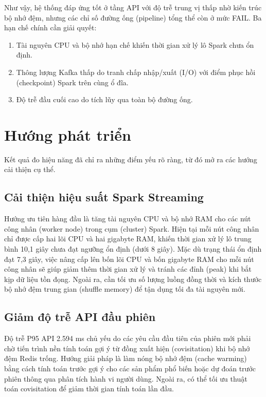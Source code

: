 \documentclass[../BTL.tex]{subfiles}
\begin{document}
Như vậy, hệ thống đáp ứng tốt ở tầng API với độ trễ trung vị thấp nhờ kiến trúc bộ nhớ đệm, nhưng các chỉ số đường ống (pipeline) tổng thể còn ở mức FAIL. Ba hạn chế chính cần giải quyết:
\begin{enumerate}
    \item Tài nguyên CPU và bộ nhớ hạn chế khiến thời gian xử lý lô Spark chưa ổn định.
    \item Thông lượng Kafka thấp do tranh chấp nhập/xuất (I/O) với điểm phục hồi (checkpoint) Spark trên cùng ổ đĩa.
    \item Độ trễ đầu cuối cao do tích lũy qua toàn bộ đường ống.
\end{enumerate}

\section{Hướng phát triển}

Kết quả đo hiệu năng đã chỉ ra những điểm yếu rõ ràng, từ đó mở ra các hướng cải thiện cụ thể.

\subsection{Cải thiện hiệu suất Spark Streaming}
Hướng ưu tiên hàng đầu là tăng tài nguyên CPU và bộ nhớ RAM cho các nút công nhân (worker node) trong cụm (cluster) Spark. Hiện tại mỗi nút công nhân chỉ được cấp hai lõi CPU và hai gigabyte RAM, khiến thời gian xử lý lô trung bình 10,1 giây chưa đạt ngưỡng ổn định (dưới 8 giây). Mặc dù trạng thái ổn định đạt 7,3 giây, việc nâng cấp lên bốn lõi CPU và bốn gigabyte RAM cho mỗi nút công nhân sẽ giúp giảm thêm thời gian xử lý và tránh các đỉnh (peak) khi bắt kịp dữ liệu tồn đọng. Ngoài ra, cần tối ưu số lượng luồng đồng thời và kích thước bộ nhớ đệm trung gian (shuffle memory) để tận dụng tối đa tài nguyên mới.

\subsection{Giảm độ trễ API đầu phiên}
Độ trễ P95 API 2.594 ms chủ yếu do các yêu cầu đầu tiên của phiên mới phải chờ tiến trình nền tính toán gợi ý từ đồng xuất hiện (covisitation) khi bộ nhớ đệm Redis trống. Hướng giải pháp là làm nóng bộ nhớ đệm (cache warming) bằng cách tính toán trước gợi ý cho các sản phẩm phổ biến hoặc dự đoán trước phiên thông qua phân tích hành vi người dùng. Ngoài ra, có thể tối ưu thuật toán covisitation để giảm thời gian tính toán lần đầu.
\end{document}
